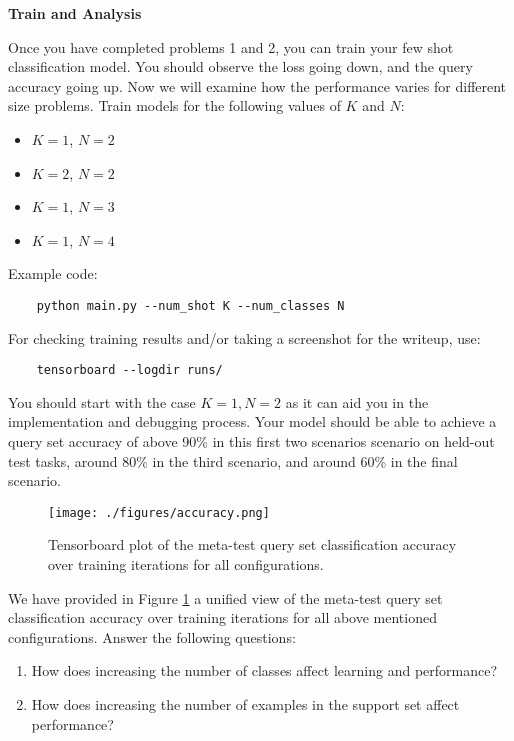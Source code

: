 \item {}  {\bf Train and Analysis}

Once you have completed problems 1 and 2, you can train your few shot classification model. You should observe the loss going down, and the query accuracy going up. Now we will examine how the performance varies for different size problems.
Train models for the following values of $K$ and $N$:
\begin{itemize}
    \item $K = 1$, $N=2$ %
    \item $K = 2$, $N=2$ %
    \item $K = 1$, $N=3$ %
    \item $K = 1$, $N=4$ %
\end{itemize}

Example code:
\begin{verbatim}
    python main.py --num_shot K --num_classes N
\end{verbatim}  

For checking training results and/or taking a screenshot for the writeup, use:
\begin{verbatim}
    tensorboard --logdir runs/
\end{verbatim}

You should start with the case $K=1 , N=2$ as it can aid you in the implementation and debugging process. Your model should be able to achieve a query set accuracy of above 90\% in this first two scenarios scenario on held-out test tasks, around 80\% in the third scenario, and around 60\% in the final scenario.

\begin{figure}
    \centering
    \texttt{[image: ./figures/accuracy.png]}
    \vspace{-5mm}
    \caption{Tensorboard plot of the meta-test query set classification accuracy over training iterations for all configurations.}
    \label{accuracy}
\end{figure}

    We have provided in Figure \ref{accuracy} a unified view of the meta-test query set classification accuracy over training iterations for all above mentioned configurations. Answer the following questions:

\begin{enumerate}
    \item How does increasing the number of classes affect learning and performance?
    \item How does increasing the number of examples in the support set affect performance?    
\end{enumerate}

\clearpage